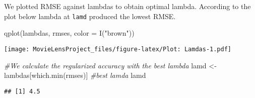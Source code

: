 \documentclass[
]{article}
\newenvironment{Shaded}{\begin{snugshade}}{\end{snugshade}}
\newcommand{\AttributeTok}[1]{\textcolor[rgb]{0.77,0.63,0.00}{#1}}
\newcommand{\CommentTok}[1]{\textcolor[rgb]{0.56,0.35,0.01}{\textit{#1}}}
\newcommand{\FunctionTok}[1]{\textcolor[rgb]{0.00,0.00,0.00}{#1}}
\newcommand{\NormalTok}[1]{#1}
\newcommand{\OtherTok}[1]{\textcolor[rgb]{0.56,0.35,0.01}{#1}}
\newcommand{\StringTok}[1]{\textcolor[rgb]{0.31,0.60,0.02}{#1}}
\begin{document}
We plotted RMSE against lambdas to obtain optimal lambda. According to
the plot below lambda at \texttt{lamd} produced the lowest RMSE.

\begin{Shaded}
\begin{Highlighting}[]
  \FunctionTok{qplot}\NormalTok{(lambdas, rmses, }\AttributeTok{color =} \FunctionTok{I}\NormalTok{(}\StringTok{"brown"}\NormalTok{)) }
\end{Highlighting}
\end{Shaded}

\texttt{[image: MovieLensProject\_files/figure-latex/Plot: Lamdas-1.pdf]}

\begin{Shaded}
\begin{Highlighting}[]
  \CommentTok{\#We calculate the regularized accuracy with the best lambda}
\NormalTok{  lamd }\OtherTok{\textless{}{-}}\NormalTok{ lambdas[}\FunctionTok{which.min}\NormalTok{(rmses)] }\CommentTok{\#best lamda}
\NormalTok{  lamd}
\end{Highlighting}
\end{Shaded}

\begin{verbatim}
## [1] 4.5
\end{verbatim}
\end{document}

